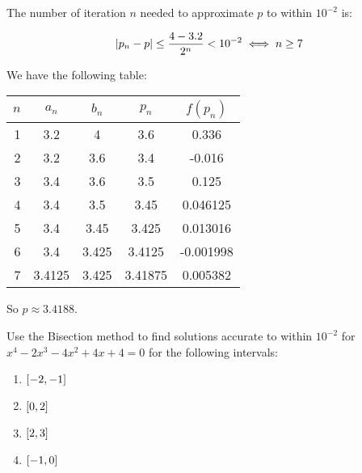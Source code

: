 \documentclass[../../Assignments.tex]{subfiles}
\begin{document}
\begin{solution}
\begin{enumerate}[label = (\alph*)]
            The number of iteration \(n\) needed to approximate \(p\) to within
            \(10^{-2}\) is:

            \[\abs{p_n - p} \leq \frac{4 - \num{3.2}}{2^n} < 10^{-2} \iff n \geq 7\]

            We have the following table:

            \begin{table}[H]
                \centering
                \begin{tabular}{r S[table-format=1.5] S[table-format=1.6] S[table-format=1.6] S[table-format=-1.6]}
                    \toprule
                    \(n\)  &  {\(a_n\)}  &  {\(b_n\)}  &  {\(p_n\)}  &  {\(f(p_n)\)}  \\
                      &  3.2        &  4          &  3.6        &   0.336        \\
                        2  &  3.2        &  3.6        &  3.4        &  -0.016        \\
                        3  &  3.4        &  3.6        &  3.5        &   0.125        \\
                        4  &  3.4        &  3.5        &  3.45       &   0.046125     \\
                        5  &  3.4        &  3.45       &  3.425      &   0.013016     \\
                        6  &  3.4        &  3.425      &  3.4125     &  -0.001998     \\
                        7  &  3.4125     &  3.425      &  3.41875    &   0.005382     \\
                    \bottomrule
                \end{tabular}
            \end{table}

            So \(p \approx \num{3.4188}\).
    \end{enumerate}
\end{solution}

\begin{exercise}
    Use the Bisection method to find solutions accurate to within \(10^{-2}\)
    for \(x^4 - 2x^3 - 4x^2 + 4x + 4 = 0\) for the following intervals:

    \begin{multicols}{4}
        \begin{enumerate}[label = (\alph*)]
            \item \(\interval{-2}{-1}\)
            \item \(\interval{0}{2}\)
            \item \(\interval{2}{3}\)
            \item \(\interval{-1}{0}\)
        \end{enumerate}
    \end{multicols}
\end{exercise}
\end{document}
